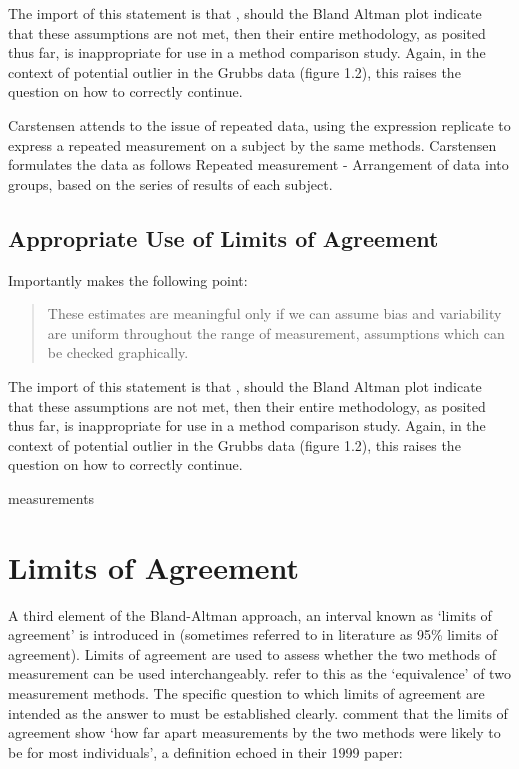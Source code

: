 \documentclass[Main.tex]{subfiles}
\begin{document}
	The import of this statement is that , should the Bland Altman
	plot indicate that these assumptions are not met, then their
	entire methodology, as posited thus far, is inappropriate for use
	in a method comparison study. Again, in the context of potential
	outlier in the Grubbs data (figure 1.2), this raises the question
	on how to correctly continue.
	
	Carstensen attends to the issue of repeated data, using the
	expression replicate to express a repeated measurement on a
	subject by the same methods. Carstensen formulates the data as
	follows Repeated measurement - Arrangement of data into groups,
	based on the series of results of each subject.
	
	\subsection{Appropriate Use of Limits of Agreement}
	Importantly \citet{BA99} makes the following point:
	\begin{quote}These estimates are meaningful only if we can assume
		bias and variability are uniform throughout the range of
		measurement, assumptions which can be checked graphically.
	\end{quote}
	
	The import of this statement is that , should the Bland Altman
	plot indicate that these assumptions are not met, then their
	entire methodology, as posited thus far, is inappropriate for use
	in a method comparison study. Again, in the context of potential
	outlier in the Grubbs data (figure 1.2), this raises the question
	on how to correctly continue.
	
	measurements
\section{Limits of Agreement}
A third element of the Bland-Altman approach, an interval known as `limits of agreement' is introduced in \citet*{BA86}
(sometimes referred to in literature as 95\% limits of agreement). Limits of agreement are used to assess whether the two methods of
measurement can be used interchangeably. \citet{BA86} refer to this as the `equivalence' of two measurement methods. The specific question to which limits of agreement are intended as the answer to must be established clearly. \citet*{BA95} comment that the limits of agreement show `how far apart measurements by the two methods were likely to be for
most individuals', a definition echoed in their 1999 paper:
\end{document}
